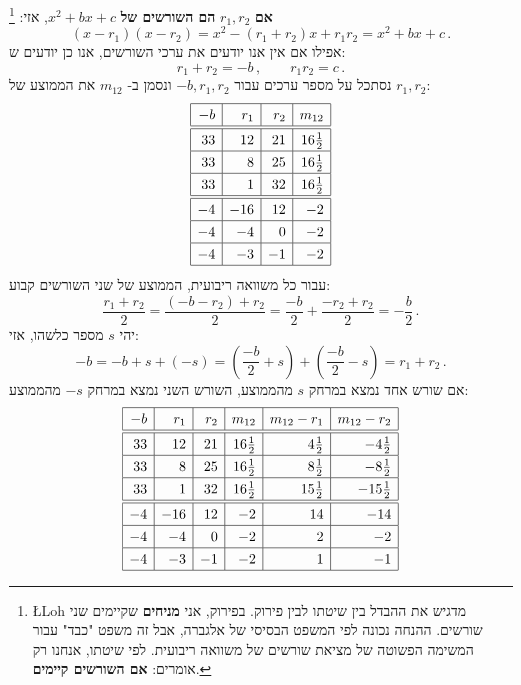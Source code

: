 \textbf{אם}
$r_1,r_2$
\textbf{הם השורשים של}
$x^2+bx+c$,
אזי:%
\footnote{%
\L{Loh}
מדגיש את ההבדל בין שיטתו לבין פירוק. בפירוק, אני 
\textbf{מניחים}
שקיימים שני שורשים. ההנחה נכונה לפי המשפט הבסיסי של אלגברה, אבל זה משפט "כבד" עבור המשימה הפשוטה של מציאת שורשים של משוואה ריבועית. לפי שיטתו, אנחנו רק אומרים:
\textbf{אם השורשים קיימים}.%
}
\[
(x-r_1)(x-r_2)=x^2 - (r_1+r_2)x + r_1r_2=x^2+bx+c\,.
\]
אפילו אם אין אנו יודעים את ערכי השורשים, אנו כן יודעים ש:
\[
r_1+r_2 = -b\,,\quad\quad r_1r_2=c\,.
\]
נסתכל על מספר ערכים עבור
$-b,r_1,r_2$
ונסמן ב-%
$m_{12}$
את הממוצע של
$r_1,r_2$:
\[
\renewcommand{\arraystretch}{1.3}
\begin{array}{|r|r|r|r|}
\hline
-b& r_1 & r_2 &m_{12}\\\hline
\hline
33 & 12 & 21 & 16\frac{1}{2}\\\hline
33 & 8 & 25 & 16\frac{1}{2}\\\hline
33 & 1 & 32 & 16\frac{1}{2}\\\hline
\hline
-4 & -16 & 12 & -2 \\\hline
-4 & -4 & 0 & -2 \\\hline
-4 & -3 & -1 & -2 \\\hline
\end{array}
\]
עבור כל משוואה ריבועית, הממוצע של שני השורשים קבוע:
\[
\frac{r_1+r_2}{2}=
\frac{(-b-r_2)+r_2}{2}=
\frac{-b}{2}+\frac{-r_2+r_2}{2}=
-\frac{b}{2}\,.
\]
יהי 
$s$ 
מספר כלשהו, אזי:
\[
-b=-b+s+(-s)=\left(\frac{-b}{2}+s\right) + \left(\frac{-b}{2}-s\right)=r_1+r_2\,.
\]
אם שורש אחד נמצא במרחק
$s$
מהממוצע, השורש השני נמצא במרחק
$-s$
מהממוצע:
\[
\renewcommand{\arraystretch}{1.3}
\begin{array}{|r|r|r|r|r|r|}
\hline
-b& r_1 & r_2 & m_{12}& m_{12}-r_1 & m_{12}-r_2\\\hline\hline
33 & 12 & 21 & 16\frac{1}{2}&4\frac{1}{2} & -4\frac{1}{2}  \\\hline
33 & 8 & 25 & 16\frac{1}{2}&8\frac{1}{2}&-8\frac{1}{2}\\\hline
33 & 1 & 32 & 16\frac{1}{2}&15\frac{1}{2}&-15\frac{1}{2}\\\hline
\hline
-4 & -16 & 12 & -2 &14& -14\\\hline
-4 & -4 & 0 & -2&2&-2 \\\hline
-4 & -3 & -1 & -2&1&-1 \\\hline
\end{array}
\]

\bigskip

